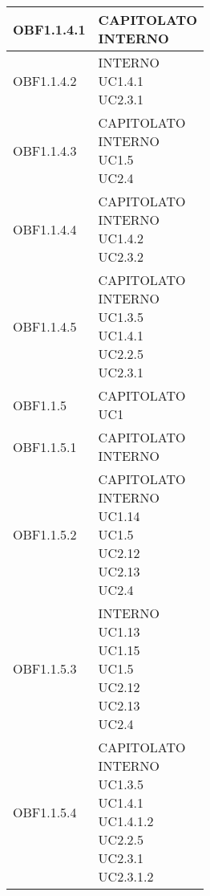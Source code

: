 \documentclass{scalatekids-article}
\begin{document}
\begin{longtable}[H]{|p{5.5cm}|p{5.5cm}|}
  \hline
  OBF1.1.4.1 & \multiLineCell[t]{CAPITOLATO\\INTERNO\\}\\
  \hline
  OBF1.1.4.2 & \multiLineCell[t]{INTERNO\\UC1.4.1\\UC2.3.1\\}\\
  \hline
  OBF1.1.4.3 & \multiLineCell[t]{CAPITOLATO\\INTERNO\\UC1.5\\UC2.4\\}\\
  \hline
  OBF1.1.4.4 & \multiLineCell[t]{CAPITOLATO\\INTERNO\\UC1.4.2\\UC2.3.2\\}\\
  \hline
  OBF1.1.4.5 & \multiLineCell[t]{CAPITOLATO\\INTERNO\\UC1.3.5\\UC1.4.1\\UC2.2.5\\UC2.3.1\\}\\
  \hline
  OBF1.1.5 & \multiLineCell[t]{CAPITOLATO\\UC1\\}\\
  \hline
  OBF1.1.5.1 & \multiLineCell[t]{CAPITOLATO\\INTERNO\\}\\
  \hline
  OBF1.1.5.2 & \multiLineCell[t]{CAPITOLATO\\INTERNO\\UC1.14\\UC1.5\\UC2.12\\UC2.13\\UC2.4\\}\\
  \hline
  OBF1.1.5.3 & \multiLineCell[t]{INTERNO\\UC1.13\\UC1.15\\UC1.5\\UC2.12\\UC2.13\\UC2.4\\}\\
  \hline
  OBF1.1.5.4 & \multiLineCell[t]{CAPITOLATO\\INTERNO\\UC1.3.5\\UC1.4.1\\UC1.4.1.2\\UC2.2.5\\UC2.3.1\\UC2.3.1.2\\}\\

\end{longtable}
\end{document}
